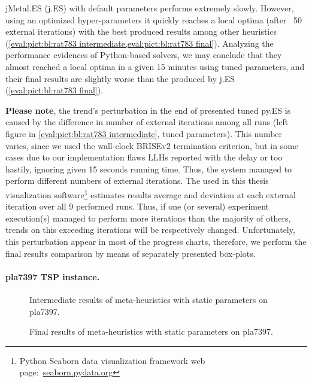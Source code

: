 jMetal.ES (j.ES) with default parameters performs extremely slowly. However, using an optimized hyper-parameters it quickly reaches a local optima (after ~50 external iterations) with the best produced results among other heuristics (\cref{eval:pict:bl:rat783 intermediate,eval:pict:bl:rat783 final}). Analyzing the performance evidences of Python-based solvers, we may conclude that they almost reached a local optima in a given 15 minutes using tuned parameters, and their final results are slightly worse than the produced by j.ES (\cref{eval:pict:bl:rat783 final}).

\textbf{Please note}, the trend's perturbation in the end of presented tuned py.ES is caused by the difference in number of external iterations among all runs (left figure in \cref{eval:pict:bl:rat783 intermediate}, tuned parameters). This number varies, since we used the wall-clock BRISEv2 termination criterion, but in some cases due to our implementation flaws LLHs reported with the delay or too hastily, ignoring given 15 seconds running time. Thus, the system managed to perform different numbers of external iterations. The used in this thesis visualization software\footnote{Python Seaborn data visualization framework web page:~\href{https://seaborn.pydata.org/}{seaborn.pydata.org}} estimates results average and deviation at each external iteration over all 9 performed runs. Thus, if one (or several) experiment execution(s) managed to perform more iterations than the majority of others, trends on this exceeding iterations will be respectively changed. Unfortunately, this perturbation appear in most of the progress charts, therefore, we perform the final results comparison by means of separately presented box-plots.


\paragraph{pla7397 TSP instance.} 

\begin{figure}[b]
	\centering
	\vspace{-20pt}
	
	\caption{Intermediate results of meta-heuristics with static parameters on pla7397.}
	\vspace{-5pt}
	\label{eval:pict:bl:pla7397 intermediate}
\end{figure}

\begin{wrapfigure}{R}{0.5\textwidth}%
	\centering
	
	\label{eval:pict:bl:pla7397 final}
	\caption{Final results of meta-heuristics with static parameters on pla7397.}
	\vspace{-10pt}
\end{wrapfigure}


